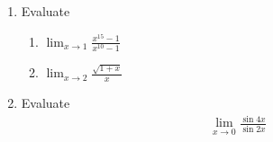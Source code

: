 \begin{enumerate}[label=\arabic*.,ref=\thesubsection.\theenumi]
%
\item Evaluate 
%
\begin{enumerate}
\item  $\lim_{x\to 1}\frac{x^15-1}{x^10-1}$
\item  $\lim_{x\to 2}\frac{\sqrt{1+x}}{x}$
\end{enumerate}
%
\item Evaluate 
%
\begin{align}
\lim_{x\to 0}\frac{\sin 4x}{\sin 2x}
\end{align}

\end{enumerate}
